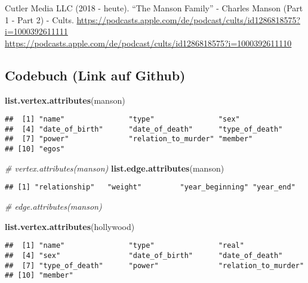 \documentclass[
]{article}
\newenvironment{Shaded}{\begin{snugshade}}{\end{snugshade}}
\newcommand{\CommentTok}[1]{\textcolor[rgb]{0.56,0.35,0.01}{\textit{#1}}}
\newcommand{\KeywordTok}[1]{\textcolor[rgb]{0.13,0.29,0.53}{\textbf{#1}}}
\newcommand{\NormalTok}[1]{#1}
\begin{document}
Cutler Media LLC (2018 - heute). ``The Manson Family'' - Charles Manson
(Part 1 - Part 2) - Cults.
\url{https://podcasts.apple.com/de/podcast/cults/id1286818575?i=1000392611111}\\
\url{https://podcasts.apple.com/de/podcast/cults/id1286818575?i=1000392611110}

\hypertarget{codebuch-link-auf-github}{%
\subsection{Codebuch (Link auf Github)}\label{codebuch-link-auf-github}}

\begin{Shaded}
\begin{Highlighting}[]
\KeywordTok{list.vertex.attributes}\NormalTok{(manson)}
\end{Highlighting}
\end{Shaded}

\begin{verbatim}
##  [1] "name"               "type"               "sex"               
##  [4] "date_of_birth"      "date_of_death"      "type_of_death"     
##  [7] "power"              "relation_to_murder" "member"            
## [10] "egos"
\end{verbatim}

\begin{Shaded}
\begin{Highlighting}[]
\CommentTok{# vertex.attributes(manson)}
\KeywordTok{list.edge.attributes}\NormalTok{(manson)}
\end{Highlighting}
\end{Shaded}

\begin{verbatim}
## [1] "relationship"   "weight"         "year_beginning" "year_end"
\end{verbatim}

\begin{Shaded}
\begin{Highlighting}[]
\CommentTok{# edge.attributes(manson)}

\KeywordTok{list.vertex.attributes}\NormalTok{(hollywood)}
\end{Highlighting}
\end{Shaded}

\begin{verbatim}
##  [1] "name"               "type"               "real"              
##  [4] "sex"                "date_of_birth"      "date_of_death"     
##  [7] "type_of_death"      "power"              "relation_to_murder"
## [10] "member"
\end{verbatim}
\end{document}
